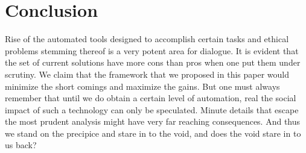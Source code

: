 \section{Conclusion}
\label{sec:-conc}
Rise of the automated tools designed to accomplish certain tasks and ethical problems stemming thereof is a very potent area for dialogue. It is evident that the set of current solutions have more cons than pros when one put them under scrutiny. We claim that the framework that we proposed in this paper would minimize the short comings and maximize the gains. But one must always remember that until we do obtain a certain level of automation, real the social impact of such a technology can only be speculated. Minute details that escape the most prudent analysis might have very far reaching consequences. And thus we stand on the precipice and stare in to the void, and does the void stare in to us back?

